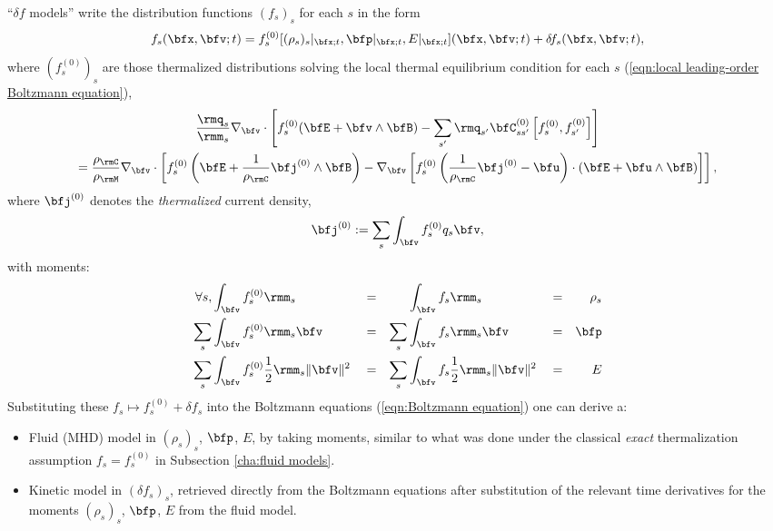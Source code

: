     \begin{definition}
        ``$\delta\! f$ models'' write the distribution functions $(f_{s})_{s}$ for each $s$ in the form
        \begin{equation}
            f_{s}(\bfx, \bfv; t)  =  f_{s}^{(0)}[(\rho_{s})_{s}|_{\bfx; t}, \bfp|_{\bfx; t}, E|_{\bfx; t}](\bfx, \bfv; t) + \delta\! f_{s}(\bfx, \bfv; t),
        \end{equation}
        where $\left(f_{s}^{(0)}\right)_{s}$ are those thermalized distributions solving the local thermal equilibrium condition for each $s$ (\ref{eqn:local leading-order Boltzmann equation}),
        \begin{multline}\label{eqn:thermal equilibrium identity}
            \frac{\rmq_{s}}{\rmm_{s}}\nabla_{\bfv}\cdot\left[f_{s}^{(0)}(\bfE + \bfv\wedge\bfB) - \sum_{s'}\rmq_{s'}\bfC_{ss'}^{(0)}\left[f_{s}^{(0)}, f_{s'}^{(0)}\right]\right]  \\
            =  \frac{\rho_{\rmC}}{\rho_{\rmM}}\nabla_{\bfv}\cdot\left[f_{s}^{(0)}\left(\bfE + \frac{1}{\rho_{\rmC}}\bfj^{(0)}\wedge\bfB\right) - \nabla_{\bfv}\left[f_{s}^{(0)}\left(\frac{1}{\rho_{\rmC}}\bfj^{(0)} - \bfu\right)\cdot\left(\bfE + \bfu\wedge\bfB\right)\right]\right],
        \end{multline}
        where $\bfj^{(0)}$ denotes the \emph{thermalized} current density,
        \begin{equation}
            \bfj^{(0)}  :=  \sum_{s}\int_{\bfv}f_{s}^{(0)}q_{s}\bfv,
        \end{equation}
        with moments:
        \begin{align}
            \forall s,          &\int_{\bfv}f_{s}^{(0)}\rmm_{s}                         &  &=  &          &\int_{\bfv}f_{s}\rmm_{s}                         &  &=  &  \rho_{s}  \label{eqn:background mass moment}  \\
                        \sum_{s}&\int_{\bfv}f_{s}^{(0)}\rmm_{s}\bfv                     &  &=  &  \sum_{s}&\int_{\bfv}f_{s}\rmm_{s}\bfv                     &  &=  &  \bfp  \\
                        \sum_{s}&\int_{\bfv}f_{s}^{(0)}\frac{1}{2}\rmm_{s}\|\bfv\|^{2}  &  &=  &  \sum_{s}&\int_{\bfv}f_{s}\frac{1}{2}\rmm_{s}\|\bfv\|^{2}  &  &=  &  E  \label{eqn:background energy moment}
        \end{align}
        Substituting these $f_{s}  \mapsto  f_{s}^{(0)} + \delta\! f_{s}$ into the Boltzmann equations (\ref{eqn:Boltzmann equation}) one can derive a:
        \begin{itemize}
            \item  Fluid (MHD) model in $(\rho_{s})_{s}$, $\bfp$, $E$, by taking moments, similar to what was done under the classical \emph{exact} thermalization assumption $f_{s}  =  f_{s}^{(0)}$ in Subsection \ref{cha:fluid models}.
            \item  Kinetic model in $(\delta\! f_{s})_{s}$, retrieved directly from the Boltzmann equations after substitution of the relevant time derivatives for the moments $(\rho_{s})_{s}$, $\bfp$, $E$ from the fluid model.
        \end{itemize}
    \end{definition}

